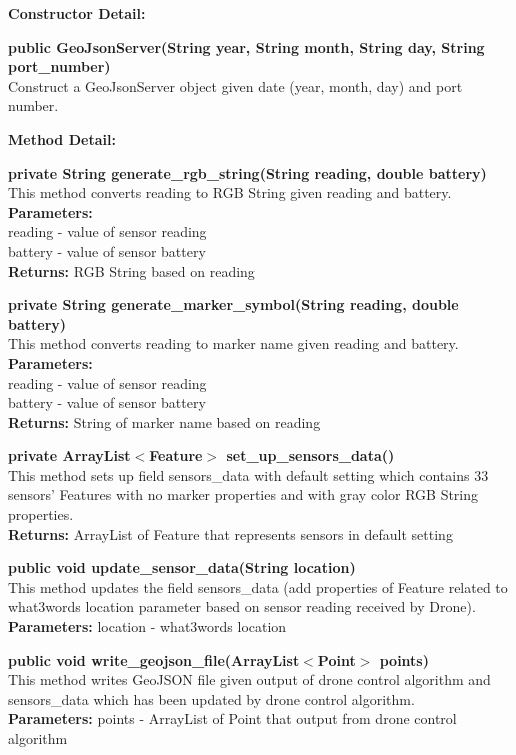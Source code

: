 \documentclass[12pt]{article}
\begin{document}
\textbf{Constructor Detail:}

\textbf{public GeoJsonServer(String year, String month, String day, String port\_number)}\\
Construct a GeoJsonServer object given date (year, month, day) and port number.

\textbf{Method Detail:}

\textbf{private String generate\_rgb\_string(String reading, double battery)}\\
This method converts reading to RGB String given reading and battery.\\
\textbf{Parameters:} \\
reading - value of sensor reading\\
battery - value of sensor battery\\
\textbf{Returns:} RGB String based on reading

\textbf{private String generate\_marker\_symbol(String reading, double battery)}\\
This method converts reading to marker name given reading and battery.\\
\textbf{Parameters:} \\
reading - value of sensor reading\\
battery - value of sensor battery\\
\textbf{Returns:} String of marker name based on reading

\textbf{private ArrayList$<$Feature$>$ set\_up\_sensors\_data()}\\
This method sets up field sensors\_data with default setting which contains 33 sensors' Features with no marker properties and with gray color RGB String properties.\\
\textbf{Returns:} ArrayList of Feature that represents sensors in default setting

\textbf{public void update\_sensor\_data(String location)}\\
This method updates the field sensors\_data (add properties of Feature related to what3words location parameter based on sensor reading received by Drone).\\
\textbf{Parameters:} location - what3words location

\textbf{public void write\_geojson\_file(ArrayList$<$Point$>$ points)}\\
This method writes GeoJSON file given output of drone control algorithm and sensors\_data which has been updated by drone control algorithm.\\
\textbf{Parameters:} points - ArrayList of Point that output from drone control algorithm
\end{document}
